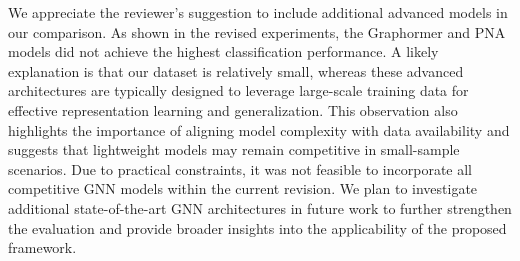 \documentclass[12pt,technote,onecolumn]{IEEEtran}
\begin{document}
\begin{table}[htbp]
\centering
\caption{Performance Comparison of AD Detection}
\label{tab:evaluation_comparison}
\renewcommand{\arraystretch}{1.3}
\vspace{1mm}
\end{table}


We appreciate the reviewer’s suggestion to include additional advanced models in our comparison. As shown in the revised experiments, the Graphormer and PNA models did not achieve the highest classification performance. A likely explanation is that our dataset is relatively small, whereas these advanced architectures are typically designed to leverage large-scale training data for effective representation learning and generalization. This observation also highlights the importance of aligning model complexity with data availability and suggests that lightweight models may remain competitive in small-sample scenarios. Due to practical constraints, it was not feasible to incorporate all competitive GNN models within the current revision. We plan to investigate additional state-of-the-art GNN architectures in future work to further strengthen the evaluation and provide broader insights into the applicability of the proposed framework.
\end{document}
